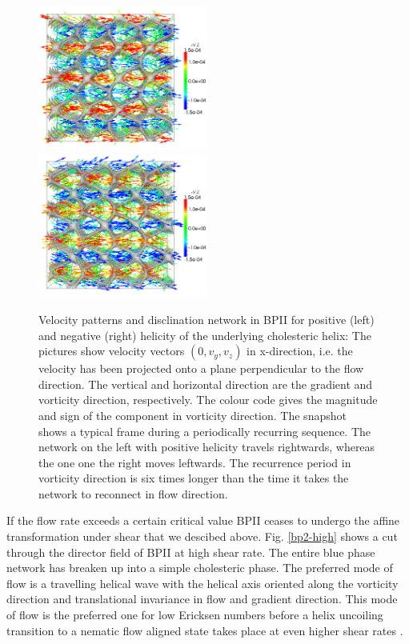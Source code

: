 \documentclass[aps,pre,reprint,superscriptaddress]{revtex4}
\begin{document}
\begin{figure}[h]
\includegraphics[width=0.495\textwidth]{v_yz-v_z-160k_run902.png}
\includegraphics[width=0.495\textwidth]{v_yz-v_z-160k_run903.png}
\caption{Velocity patterns and disclination network in BPII for positive (left) and negative (right) helicity of the 
underlying cholesteric helix: The pictures show velocity vectors $(0,v_y,v_z)$ in x-direction, 
i.e. the velocity has been projected onto a plane perpendicular to the flow direction. 
The vertical and horizontal direction are the gradient and vorticity direction, respectively.
The colour code gives the magnitude and sign of the component in vorticity direction.
The snapshot shows a typical frame during a periodically recurring sequence.
The network on the left with positive helicity travels rightwards, whereas the one one the right
moves leftwards. The recurrence period in vorticity direction is six times longer than the time it takes the network 
to reconnect in flow direction.}
\label{bp2-velo}
\end{figure}

If the flow rate exceeds a certain critical value BPII ceases to undergo the affine transformation under shear that we
descibed above. Fig. \ref{bp2-high} shows a cut through the director field of BPII at high shear rate.
The entire blue phase network has breaken up into a simple cholesteric phase. The preferred mode of flow is 
a travelling helical wave with the helical axis oriented along the vorticity direction and translational 
invariance in flow and gradient direction. This mode of flow is the preferred one for low Ericksen numbers
before a helix uncoiling transition to a nematic flow aligned state takes place at even higher
shear rates \cite{Rey:1996a, Rey:1996b}.
\end{document}
